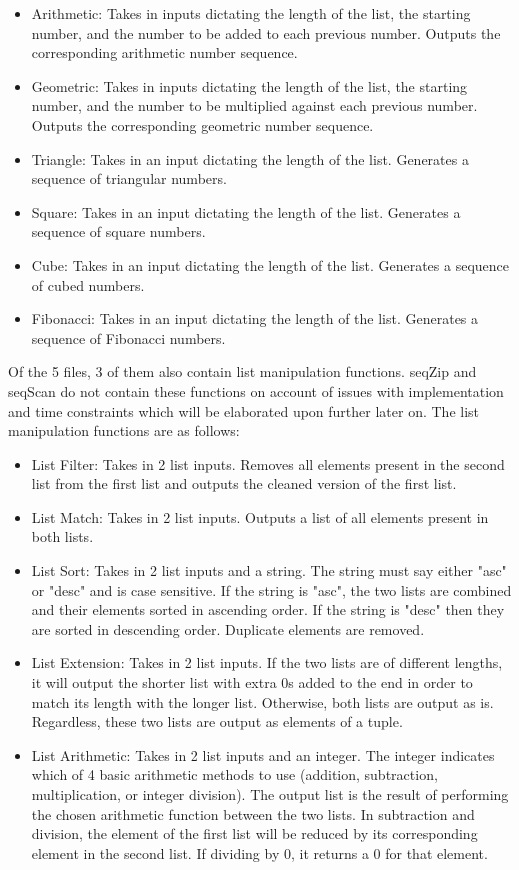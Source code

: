 \documentclass{article}
\theoremstyle{theorem}
\theoremstyle{definition}
\theoremstyle{remark}
\begin{document}
\begin {itemize}
\item Arithmetic: Takes in inputs dictating the length of the list, the starting number, and the number to be added to each previous number. Outputs the corresponding arithmetic number sequence.
\item Geometric:  Takes in inputs dictating the length of the list, the starting number, and the number to be multiplied against each previous number. Outputs the corresponding geometric number sequence.
\item Triangle: Takes in an input dictating the length of the list. Generates a sequence of triangular numbers.
\item Square: Takes in an input dictating the length of the list. Generates a sequence of square numbers.
\item Cube: Takes in an input dictating the length of the list. Generates a sequence of cubed numbers.
\item Fibonacci: Takes in an input dictating the length of the list. Generates a sequence of Fibonacci numbers.
\end {itemize}
%
Of the 5 files, 3 of them also contain list manipulation functions. seqZip and seqScan do not contain these functions on account of issues with implementation and time constraints which will be elaborated upon further later on. The list manipulation functions are as follows:

\begin {itemize}
\item List Filter: Takes in 2 list inputs. Removes all elements present in the second list from the first list and outputs the cleaned version of the first list.
\item List Match: Takes in 2 list inputs. Outputs a list of all elements present in both lists.
\item List Sort: Takes in 2 list inputs and a string. The string must say either "asc" or "desc" and is case sensitive. If the string is "asc", the two lists are combined and their elements sorted in ascending order. If the string is "desc" then they are sorted in descending order. Duplicate elements are removed.
\item List Extension: Takes in 2 list inputs. If the two lists are of different lengths, it will output the shorter list with extra 0s added to the end in order to match its length with the longer list. Otherwise, both lists are output as is. Regardless, these two lists are output as elements of a tuple.
\item List Arithmetic: Takes in 2 list inputs and an integer. The integer indicates which of 4 basic arithmetic methods to use (addition, subtraction, multiplication, or integer division). The output list is the result of performing the chosen arithmetic function between the two lists. In subtraction and division, the element of the first list will be reduced by its corresponding element in the second list. If dividing by 0, it returns a 0 for that element.
\end {itemize}
\end{document}
